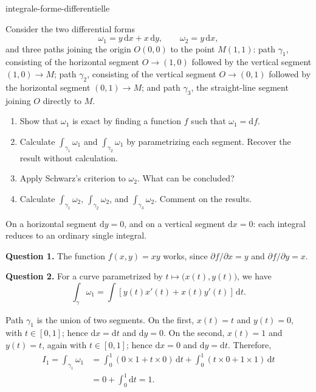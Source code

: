 
\begin{exo}{integrale-forme-differentielle}

Consider the two differential forms
\[
\omega_1 = y\,\mathrm{d}x + x\,\mathrm{d}y,
\qquad
\omega_2 = y\,\mathrm{d}x,
\]
and three paths joining the origin $O(0,0)$ to the point $M(1,1)$: path
$\gamma_1$, consisting of the horizontal segment $O\to(1,0)$ followed by the
vertical segment $(1,0)\to M$; path $\gamma_2$, consisting of the vertical
segment $O\to(0,1)$ followed by the horizontal segment $(0,1)\to M$; and path
$\gamma_3$, the straight-line segment joining $O$ directly to $M$.

\begin{enumerate}
\item Show that $\omega_1$ is exact by finding a function $f$ such that $\omega_1 = \mathrm{d}f$.
\item Calculate $\int_{\gamma_1}\omega_1$ and $\int_{\gamma_2}\omega_1$ by parametrizing each segment. Recover the result without calculation.
\item Apply Schwarz's criterion to $\omega_2$. What can be concluded?
\item Calculate $\int_{\gamma_1}\omega_2$, $\int_{\gamma_2}\omega_2$, and $\int_{\gamma_3}\omega_2$. Comment on the results.
\end{enumerate}

\begin{indication}
On a horizontal segment $\mathrm{d}y = 0$, and on a vertical segment
$\mathrm{d}x = 0$: each integral reduces to an ordinary single integral.
\end{indication}

\begin{solution}
\textbf{Question 1.} The function $f(x,y) = xy$ works, since $\partial f/\partial x = y$ and $\partial f/\partial y = x$.

\textbf{Question 2.} For a curve parametrized by
$t\mapsto\bigl(x(t),y(t)\bigr)$, we have
\[
\int_\gamma\omega_1
= \int \left[y(t)x'(t)+x(t)y'(t)\right]\,\mathrm{d}t.
\]

Path $\gamma_1$ is the union of two segments. On the first,
$x(t)=t$ and $y(t)=0$, with $t\in[0,1]$; hence $\mathrm{d}x=\mathrm{d}t$
and $\mathrm{d}y=0$. On the second, $x(t)=1$ and $y(t)=t$, again with
$t\in[0,1]$; hence $\mathrm{d}x=0$ and $\mathrm{d}y=\mathrm{d}t$. Therefore,
\[
\begin{aligned}
I_1
= \int_{\gamma_1}\omega_1
&= \int_0^1\left(0\times 1+t\times 0\right)\,\mathrm{d}t
 + \int_0^1\left(t\times 0+1\times 1\right)\,\mathrm{d}t \\
&= 0+\int_0^1\mathrm{d}t = 1.
\end{aligned}
\]


\end{solution}
\end{exo}
